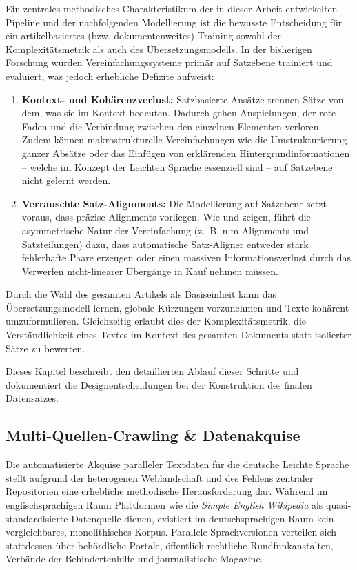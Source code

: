 Ein zentrales methodisches Charakteristikum der in dieser Arbeit entwickelten Pipeline und der nachfolgenden Modellierung ist die bewusste Entscheidung für ein artikelbasiertes (bzw. dokumentenweites) Training sowohl der Komplexitätsmetrik als auch des Übersetzungsmodells. In der bisherigen Forschung wurden Vereinfachungssysteme primär auf Satzebene trainiert und evaluiert, was jedoch erhebliche Defizite aufweist:
\begin{enumerate}
    \item \textbf{Kontext- und Kohärenzverlust:} Satzbasierte Ansätze trennen Sätze von dem, was sie im Kontext bedeuten. Dadurch gehen Anspielungen, der rote Faden und die Verbindung zwischen den einzelnen Elementen verloren. Zudem können makrostrukturelle Vereinfachungen wie die Umstrukturierung ganzer Absätze oder das Einfügen von erklärenden Hintergrundinformationen – welche im Konzept der Leichten Sprache essenziell sind – auf Satzebene nicht gelernt werden.
    \item \textbf{Verrauschte Satz-Alignments:} Die Modellierung auf Satzebene setzt voraus, dass präzise Alignments vorliegen. Wie \citet{stodden2023deplain} und \citet{stajner2018cats} zeigen, führt die asymmetrische Natur der Vereinfachung (z.~B. n:m-Alignments und Satzteilungen) dazu, dass automatische Satz-Aligner entweder stark fehlerhafte Paare erzeugen oder einen massiven Informationsverlust durch das Verwerfen nicht-linearer Übergänge in Kauf nehmen müssen.
\end{enumerate}
Durch die Wahl des gesamten Artikels als Basiseinheit kann das Übersetzungsmodell lernen, globale Kürzungen vorzunehmen und Texte kohärent umzuformulieren. Gleichzeitig erlaubt dies der Komplexitätsmetrik, die Verständlichkeit eines Textes im Kontext des gesamten Dokuments statt isolierter Sätze zu bewerten.

Dieses Kapitel beschreibt den detaillierten Ablauf dieser Schritte und dokumentiert die Designentscheidungen bei der Konstruktion des finalen Datensatzes.

\subsection{Multi-Quellen-Crawling \& Datenakquise}
\label{sec:crawling_datenakquise}

Die automatisierte Akquise paralleler Textdaten für die deutsche Leichte Sprache stellt aufgrund der heterogenen Weblandschaft und des Fehlens zentraler Repositorien eine erhebliche methodische Herausforderung dar. Während im englischsprachigen Raum Plattformen wie die \textit{Simple English Wikipedia} als quasi-standardisierte Datenquelle dienen, existiert im deutschsprachigen Raum kein vergleichbares, monolithisches Korpus. Parallele Sprachversionen verteilen sich stattdessen über behördliche Portale, öffentlich-rechtliche Rundfunkanstalten, Verbände der Behindertenhilfe und journalistische Magazine. 

